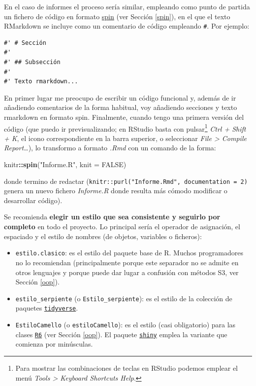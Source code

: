 \documentclass[
]{book}
\newenvironment{Shaded}{\begin{snugshade}}{\end{snugshade}}
\newcommand{\AttributeTok}[1]{\textcolor[rgb]{0.13,0.29,0.53}{#1}}
\newcommand{\ConstantTok}[1]{\textcolor[rgb]{0.56,0.35,0.01}{#1}}
\newcommand{\FunctionTok}[1]{\textcolor[rgb]{0.13,0.29,0.53}{\textbf{#1}}}
\newcommand{\NormalTok}[1]{#1}
\newcommand{\SpecialCharTok}[1]{\textcolor[rgb]{0.81,0.36,0.00}{\textbf{#1}}}
\newcommand{\StringTok}[1]{\textcolor[rgb]{0.31,0.60,0.02}{#1}}
\theoremstyle{break}
\theoremstyle{nonumberplain}
\let\oldfootnote\footnote
\renewcommand\footnote[1]{\oldfootnote{\hspace{2mm}#1}}
\begin{document}
En el caso de informes el proceso sería similar, empleando como punto de partida un fichero de código en formato \href{https://yihui.org/knitr/demo/stitch/\#spin-comment-out-texts}{spin} (ver Sección \ref{spin}), en el que el texto RMarkdown se incluye como un comentario de código empleando \texttt{\#\textquotesingle{}}.
Por ejemplo:

\begin{verbatim}
#' # Sección
#'
#' ## Subsección
#'
#' Texto rmarkdown...
\end{verbatim}

En primer lugar me preocupo de escribir un código funcional y, además de ir añadiendo comentarios de la forma habitual, voy añadiendo secciones y texto rmarkdown en formato spin.
Finalmente, cuando tengo una primera versión del código (que puedo ir previsualizando; en RStudio basta con pulsar\footnote{Para mostrar las combinaciones de teclas en RStudio podemos emplear el menú \emph{Tools \textgreater{} Keyboard Shortcuts Help}.} \emph{Ctrl + Shift + K}, el icono correspondiente en la barra superior, o seleccionar \emph{File \textgreater{} Compile Report\ldots{}}), lo transformo a formato \emph{.Rmd} con un comando de la forma:

\begin{Shaded}
\begin{Highlighting}[]
\NormalTok{knitr}\SpecialCharTok{::}\FunctionTok{spin}\NormalTok{(}\StringTok{"Informe.R"}\NormalTok{, }\AttributeTok{knit =} \ConstantTok{FALSE}\NormalTok{)}
\end{Highlighting}
\end{Shaded}

donde termino de redactar (\texttt{knitr::purl("Informe.Rmd",\ documentation\ =\ 2)} genera un nuevo fichero \emph{Informe.R} donde resulta más cómodo modificar o desarrollar código).

Se recomienda \textbf{elegir un estilo que sea consistente y seguirlo por completo} en todo el proyecto.
Lo principal sería el operador de asignación, el espaciado y el estilo de nombres (de objetos, variables o ficheros):

\begin{itemize}
\item
  \texttt{estilo.clasico}: es el estilo del paquete base de R. Muchos programadores no lo recomiendan (principalmente porque este separador no se admite en otros lenguajes y porque puede dar lugar a confusión con métodos S3, ver Sección \ref{oop}).
\item
  \texttt{estilo\_serpiente} (o \texttt{Estilo\_serpiente}): es el estilo de la colección de paquetes \href{https://tidyverse.tidyverse.org}{\texttt{tidyverse}}.
\item
  \texttt{EstiloCamello} (o \texttt{estiloCamello}): es el estilo (casi obligatorio) para las clases \href{https://r6.r-lib.org}{\texttt{R6}} (ver Sección \ref{oop}). El paquete \href{https://shiny.posit.co/}{\texttt{shiny}} emplea la variante que comienza por minúsculas.
\end{itemize}
\end{document}
